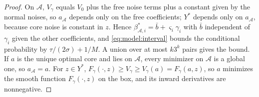 \begin{proof}
On $\mathcal A$, $V_\gamma$ equals $V_0$ plus the free noise terms plus a constant
given by the normal noises, so $a_{\mathcal A}$ depends only on the free coefficients;
$Y^*$ depends only on $a_{\mathcal A}$, because core noise is constant in $z$. Hence
$\beta^*_{\mathcal A,i}=\bar b+\varsigma_i\gamma_i$ with $\bar b$ independent of
$\gamma_i$ given the other coefficients, and \eqref{eq:model:interval} bounds the conditional
probability by $\tau/(2\sigma)+1/M$. A union over at most $k3^k$ pairs gives the
bound. If $a$ is the unique optimal core and lies on $\mathcal A$, every minimizer on
$\mathcal A$ is a global one, so $a_{\mathcal A}=a$. For $z\in Y^*$,
$F_\gamma(\cdot,z)\ge V_\gamma\ge V_\gamma(a)=F_\gamma(a,z)$, so $a$ minimizes the smooth
function $F_\gamma(\cdot,z)$ on the box, and its inward derivatives are nonnegative.
\end{proof}

